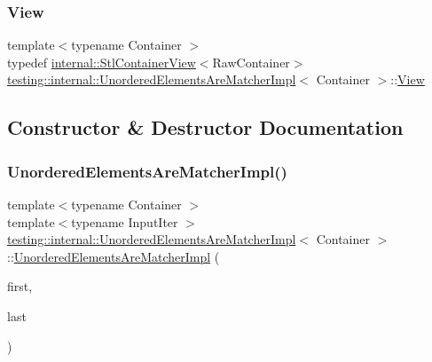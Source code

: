 \mbox{\label{classtesting_1_1internal_1_1_unordered_elements_are_matcher_impl_adbd6dfef7713dd30d569b4220eb808d3}} 
\subsubsection{\texorpdfstring{View}{View}}
{\footnotesize\ttfamily template$<$typename Container $>$ \\
typedef \hyperlink{classtesting_1_1internal_1_1_stl_container_view}{internal\+::\+Stl\+Container\+View}$<$Raw\+Container$>$ \hyperlink{classtesting_1_1internal_1_1_unordered_elements_are_matcher_impl}{testing\+::internal\+::\+Unordered\+Elements\+Are\+Matcher\+Impl}$<$ Container $>$\+::\hyperlink{classtesting_1_1internal_1_1_unordered_elements_are_matcher_impl_adbd6dfef7713dd30d569b4220eb808d3}{View}}



\subsection{Constructor \& Destructor Documentation}
\mbox{\label{classtesting_1_1internal_1_1_unordered_elements_are_matcher_impl_a0b0f40cf4de84f14020c3d4c9ba06c42}} 
\subsubsection{\texorpdfstring{Unordered\+Elements\+Are\+Matcher\+Impl()}{UnorderedElementsAreMatcherImpl()}}
{\footnotesize\ttfamily template$<$typename Container $>$ \\
template$<$typename Input\+Iter $>$ \\
\hyperlink{classtesting_1_1internal_1_1_unordered_elements_are_matcher_impl}{testing\+::internal\+::\+Unordered\+Elements\+Are\+Matcher\+Impl}$<$ Container $>$\+::\hyperlink{classtesting_1_1internal_1_1_unordered_elements_are_matcher_impl}{Unordered\+Elements\+Are\+Matcher\+Impl} (\begin{DoxyParamCaption}\item[{Input\+Iter}]{first,  }\item[{Input\+Iter}]{last }\end{DoxyParamCaption})\hspace{0.3cm}{\ttfamily [inline]}}



